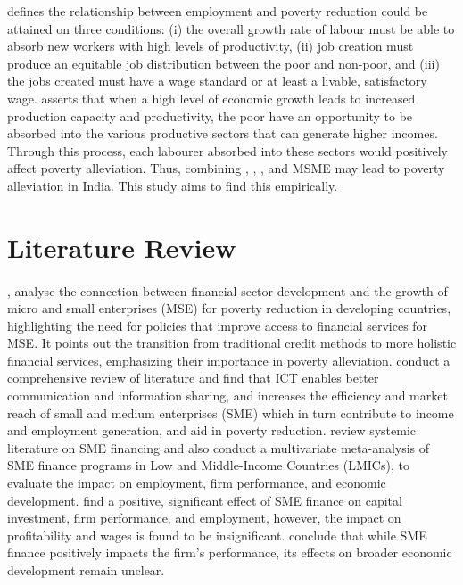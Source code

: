 \documentclass [12pt]{article}
\begin{document}
\textcite{singh1999role} defines the relationship between employment and poverty reduction could be attained on three conditions: (i) the overall growth rate of labour must be able to absorb new workers with high levels of productivity, (ii) job creation must produce an equitable job distribution between the poor and non-poor, and (iii) the jobs created must have a wage standard or at least a livable, satisfactory wage. \textcite{islam2004nexus} asserts that when a high level of economic growth leads to increased production capacity and productivity, the poor have an opportunity to be absorbed into the various productive sectors that can generate higher incomes. Through this process, each labourer absorbed into these sectors would positively affect poverty alleviation. Thus, combining \textcite{islam2004nexus}, \textcite{singh1999role}, \textcite{MSME2023}, and \textcite{purakala2020role} MSME may lead to poverty alleviation in India. This study aims to find this empirically. 
\newpage
\restoregeometry
\section{Literature Review}             

\paragraph{} \textcite{green2006finance},  analyse the connection between financial sector development and the growth of micro and small enterprises (MSE) for poverty reduction in developing countries, highlighting the need for policies that improve access to financial services for MSE. It points out the transition from traditional credit methods to more holistic financial services, emphasizing their importance in poverty alleviation. \textcite{mbuyisaetal} conduct a comprehensive review of literature and find that ICT enables better communication and information sharing, and increases the efficiency and market reach of small and medium enterprises (SME) which in turn contribute to income and employment generation, and aid in poverty reduction. \textcite{kersten2017small} review systemic literature on SME financing and also conduct a multivariate meta-analysis of SME finance programs in Low and Middle-Income Countries (LMICs), to evaluate the impact on employment, firm performance, and economic development. \textcite{kersten2017small} find a positive, significant effect of SME finance on capital investment, firm performance, and employment, however, the impact on profitability and wages is found to be insignificant. \textcite{kersten2017small} conclude that while SME finance positively impacts the firm’s performance, its effects on broader economic development remain unclear.
\end{document}
